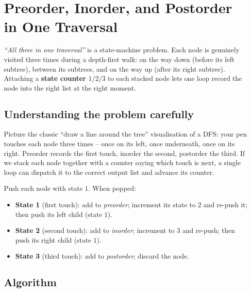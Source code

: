 \section{Preorder, Inorder, and Postorder in One Traversal}
\label{sec:trees-all-three}


\begin{patternbox}
\emph{``All three in one traversal''} is a state-machine problem. Each node
is genuinely visited three times during a depth-first walk: on the way
down (before its left subtree), between its subtrees, and on the way up
(after its right subtree). Attaching a \textbf{state counter $1/2/3$} to
each stacked node lets one loop record the node into the right list at the
right moment.
\end{patternbox}

\subsection*{Understanding the problem carefully}

Picture the classic ``draw a line around the tree'' visualisation of a
DFS: your pen touches each node three times -- once on its left, once
underneath, once on its right. Preorder records the first touch, inorder
the second, postorder the third. If we stack each node together with a
counter saying which touch is next, a single loop can dispatch it to the
correct output list and advance its counter.

\begin{ideabox}
Push each node with state $1$. When popped:
\begin{itemize}
  \item \textbf{State 1} (first touch): add to \emph{preorder}; increment
        its state to $2$ and re-push it; then push its left child (state
        $1$).
  \item \textbf{State 2} (second touch): add to \emph{inorder}; increment
        to $3$ and re-push; then push its right child (state $1$).
  \item \textbf{State 3} (third touch): add to \emph{postorder}; discard
        the node.
\end{itemize}
\end{ideabox}

\subsection*{Algorithm}

